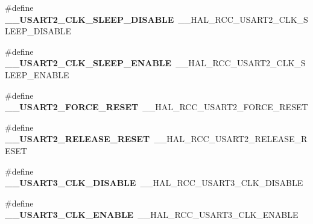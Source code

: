 \begin{DoxyCompactItemize}
\item 
\hypertarget{group___h_a_l___r_c_c___aliased_ga7996fe6f4f857778c4acbd62a106bdce}{\#define {\bfseries \-\_\-\-\_\-\-U\-S\-A\-R\-T2\-\_\-\-C\-L\-K\-\_\-\-S\-L\-E\-E\-P\-\_\-\-D\-I\-S\-A\-B\-L\-E}~\-\_\-\-\_\-\-H\-A\-L\-\_\-\-R\-C\-C\-\_\-\-U\-S\-A\-R\-T2\-\_\-\-C\-L\-K\-\_\-\-S\-L\-E\-E\-P\-\_\-\-D\-I\-S\-A\-B\-L\-E}\label{group___h_a_l___r_c_c___aliased_ga7996fe6f4f857778c4acbd62a106bdce}

\item 
\hypertarget{group___h_a_l___r_c_c___aliased_gad7970d225de9a77f3fc745293ca316ed}{\#define {\bfseries \-\_\-\-\_\-\-U\-S\-A\-R\-T2\-\_\-\-C\-L\-K\-\_\-\-S\-L\-E\-E\-P\-\_\-\-E\-N\-A\-B\-L\-E}~\-\_\-\-\_\-\-H\-A\-L\-\_\-\-R\-C\-C\-\_\-\-U\-S\-A\-R\-T2\-\_\-\-C\-L\-K\-\_\-\-S\-L\-E\-E\-P\-\_\-\-E\-N\-A\-B\-L\-E}\label{group___h_a_l___r_c_c___aliased_gad7970d225de9a77f3fc745293ca316ed}

\item 
\hypertarget{group___h_a_l___r_c_c___aliased_ga979c0d058e16fdea1923807ab635f4dd}{\#define {\bfseries \-\_\-\-\_\-\-U\-S\-A\-R\-T2\-\_\-\-F\-O\-R\-C\-E\-\_\-\-R\-E\-S\-E\-T}~\-\_\-\-\_\-\-H\-A\-L\-\_\-\-R\-C\-C\-\_\-\-U\-S\-A\-R\-T2\-\_\-\-F\-O\-R\-C\-E\-\_\-\-R\-E\-S\-E\-T}\label{group___h_a_l___r_c_c___aliased_ga979c0d058e16fdea1923807ab635f4dd}

\item 
\hypertarget{group___h_a_l___r_c_c___aliased_ga0b8442b95cc856fb66c66874d511c5bb}{\#define {\bfseries \-\_\-\-\_\-\-U\-S\-A\-R\-T2\-\_\-\-R\-E\-L\-E\-A\-S\-E\-\_\-\-R\-E\-S\-E\-T}~\-\_\-\-\_\-\-H\-A\-L\-\_\-\-R\-C\-C\-\_\-\-U\-S\-A\-R\-T2\-\_\-\-R\-E\-L\-E\-A\-S\-E\-\_\-\-R\-E\-S\-E\-T}\label{group___h_a_l___r_c_c___aliased_ga0b8442b95cc856fb66c66874d511c5bb}

\item 
\hypertarget{group___h_a_l___r_c_c___aliased_ga5493319829b9739c7495cc765162f4b3}{\#define {\bfseries \-\_\-\-\_\-\-U\-S\-A\-R\-T3\-\_\-\-C\-L\-K\-\_\-\-D\-I\-S\-A\-B\-L\-E}~\-\_\-\-\_\-\-H\-A\-L\-\_\-\-R\-C\-C\-\_\-\-U\-S\-A\-R\-T3\-\_\-\-C\-L\-K\-\_\-\-D\-I\-S\-A\-B\-L\-E}\label{group___h_a_l___r_c_c___aliased_ga5493319829b9739c7495cc765162f4b3}

\item 
\hypertarget{group___h_a_l___r_c_c___aliased_ga821236fc8d13c8b707128514c0a42a02}{\#define {\bfseries \-\_\-\-\_\-\-U\-S\-A\-R\-T3\-\_\-\-C\-L\-K\-\_\-\-E\-N\-A\-B\-L\-E}~\-\_\-\-\_\-\-H\-A\-L\-\_\-\-R\-C\-C\-\_\-\-U\-S\-A\-R\-T3\-\_\-\-C\-L\-K\-\_\-\-E\-N\-A\-B\-L\-E}\label{group___h_a_l___r_c_c___aliased_ga821236fc8d13c8b707128514c0a42a02}


\end{DoxyCompactItemize}

